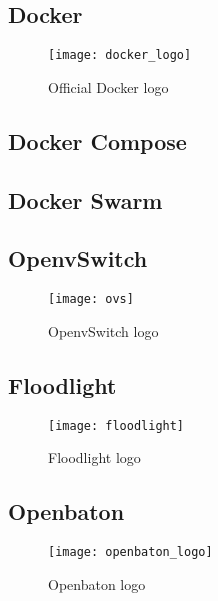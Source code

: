 \subsection{Docker}
\begin{figure}[t]
  \centering \texttt{[image: docker\_logo]}
  \caption{Official Docker logo}
  \label{chap:intro:img:docker_logo}
\end{figure}

\subsection{Docker Compose}

\subsection{Docker Swarm}

\subsection{OpenvSwitch}
\begin{figure}[h]
 \centering \texttt{[image: ovs]}
 \caption{OpenvSwitch logo}
 \label{chap:prjan:img:ovs_logo}
\end{figure}

\subsection{Floodlight}
\begin{figure}[h]
 \centering \texttt{[image: floodlight]}
 \caption{Floodlight logo}
 \label{chap:prjan:img:floodlight_logo}
\end{figure}

\subsection{Openbaton}
\begin{figure}[h]
  \centering \texttt{[image: openbaton\_logo]}
  \caption{Openbaton logo}
  \label{chap:prjan:img:openbaton_logo}
\end{figure}